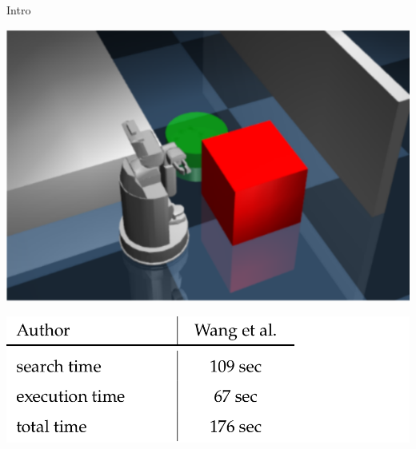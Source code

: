 \begin{frame}[fragile]{Intro}
  \begin{minipage}[l]{0.46\textwidth}
    \includegraphics[width=1.3\textwidth]{figures/introduction/wang}
  \end{minipage}\pause
  \begin{minipage}[l]{0.3\textwidth}
    \includegraphics[width=1.8\textwidth]{figures/introduction/wang_table}
    \vspace{3.0cm}
  \end{minipage}
\end{frame}

